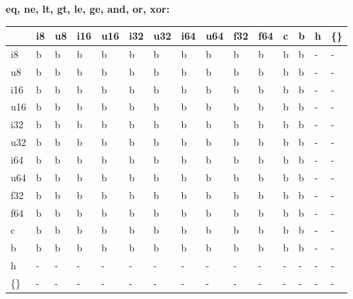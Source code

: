 \newpage
\textbf{eq, ne, lt, gt, le, ge, and, or, xor:}
\begin{scriptsize}\begin{tt}\begin{center}\vspace{-.3cm}\begin{tabular}{|m{.65cm}||m{.65cm}|m{.65cm}|m{.65cm}|m{.65cm}|m{.65cm}|m{.65cm}|m{.65cm}|m{.65cm}|m{.65cm}|m{.65cm}|m{.65cm}|m{.65cm}|m{.65cm}|m{.65cm}|}\hline 
&i8&u8&i16&u16&i32&u32&i64&u64&f32&f64&c&b&h&\{\}\\ \hline \hline
i8&b&b&b&b&b&b&b&b&b&b&b&b&-&-\\ \hline
u8&b&b&b&b&b&b&b&b&b&b&b&b&-&-\\ \hline
i16&b&b&b&b&b&b&b&b&b&b&b&b&-&-\\ \hline
u16&b&b&b&b&b&b&b&b&b&b&b&b&-&-\\ \hline
i32&b&b&b&b&b&b&b&b&b&b&b&b&-&-\\ \hline
u32&b&b&b&b&b&b&b&b&b&b&b&b&-&-\\ \hline
i64&b&b&b&b&b&b&b&b&b&b&b&b&-&-\\ \hline
u64&b&b&b&b&b&b&b&b&b&b&b&b&-&-\\ \hline
f32&b&b&b&b&b&b&b&b&b&b&b&b&-&-\\ \hline
f64&b&b&b&b&b&b&b&b&b&b&b&b&-&-\\ \hline
c&b&b&b&b&b&b&b&b&b&b&b&b&-&-\\ \hline
b&b&b&b&b&b&b&b&b&b&b&b&b&-&-\\ \hline
h&-&-&-&-&-&-&-&-&-&-&-&-&-&-\\ \hline
\{\}&-&-&-&-&-&-&-&-&-&-&-&-&-&-\\ \hline
\end{tabular}\end{center}\end{tt}\end{scriptsize} 

